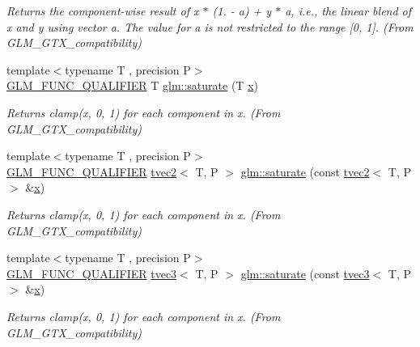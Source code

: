 \begin{DoxyCompactItemize}
\begin{DoxyCompactList}\small\item\em Returns the component-\/wise result of x $\ast$ (1. -\/ a) + y $\ast$ a, i.\+e., the linear blend of x and y using vector a. The value for a is not restricted to the range \mbox{[}0, 1\mbox{]}. (From G\+L\+M\+\_\+\+G\+T\+X\+\_\+compatibility) \end{DoxyCompactList}\item 
{\footnotesize template$<$typename T , precision P$>$ }\\\mbox{\hyperlink{setup_8hpp_a33fdea6f91c5f834105f7415e2a64407}{G\+L\+M\+\_\+\+F\+U\+N\+C\+\_\+\+Q\+U\+A\+L\+I\+F\+I\+ER}} T \mbox{\hyperlink{group__gtx__compatibility_ga0fd09e616d122bc2ed9726682ffd44b7}{glm\+::saturate}} (T \mbox{\hyperlink{glad_8h_a92d0386e5c19fb81ea88c9f99644ab1d}{x}})
\begin{DoxyCompactList}\small\item\em Returns clamp(x, 0, 1) for each component in x. (From G\+L\+M\+\_\+\+G\+T\+X\+\_\+compatibility) \end{DoxyCompactList}\item 
{\footnotesize template$<$typename T , precision P$>$ }\\\mbox{\hyperlink{setup_8hpp_a33fdea6f91c5f834105f7415e2a64407}{G\+L\+M\+\_\+\+F\+U\+N\+C\+\_\+\+Q\+U\+A\+L\+I\+F\+I\+ER}} \mbox{\hyperlink{structglm_1_1tvec2}{tvec2}}$<$ T, P $>$ \mbox{\hyperlink{group__gtx__compatibility_ga5815a26488231dfdf92242cf0c2d2107}{glm\+::saturate}} (const \mbox{\hyperlink{structglm_1_1tvec2}{tvec2}}$<$ T, P $>$ \&\mbox{\hyperlink{glad_8h_a92d0386e5c19fb81ea88c9f99644ab1d}{x}})
\begin{DoxyCompactList}\small\item\em Returns clamp(x, 0, 1) for each component in x. (From G\+L\+M\+\_\+\+G\+T\+X\+\_\+compatibility) \end{DoxyCompactList}\item 
{\footnotesize template$<$typename T , precision P$>$ }\\\mbox{\hyperlink{setup_8hpp_a33fdea6f91c5f834105f7415e2a64407}{G\+L\+M\+\_\+\+F\+U\+N\+C\+\_\+\+Q\+U\+A\+L\+I\+F\+I\+ER}} \mbox{\hyperlink{structglm_1_1tvec3}{tvec3}}$<$ T, P $>$ \mbox{\hyperlink{group__gtx__compatibility_ga02ed1a53c6df104d56b69f8fb5e9af1b}{glm\+::saturate}} (const \mbox{\hyperlink{structglm_1_1tvec3}{tvec3}}$<$ T, P $>$ \&\mbox{\hyperlink{glad_8h_a92d0386e5c19fb81ea88c9f99644ab1d}{x}})
\begin{DoxyCompactList}\small\item\em Returns clamp(x, 0, 1) for each component in x. (From G\+L\+M\+\_\+\+G\+T\+X\+\_\+compatibility) \end{DoxyCompactList}\item 

\end{DoxyCompactItemize}
